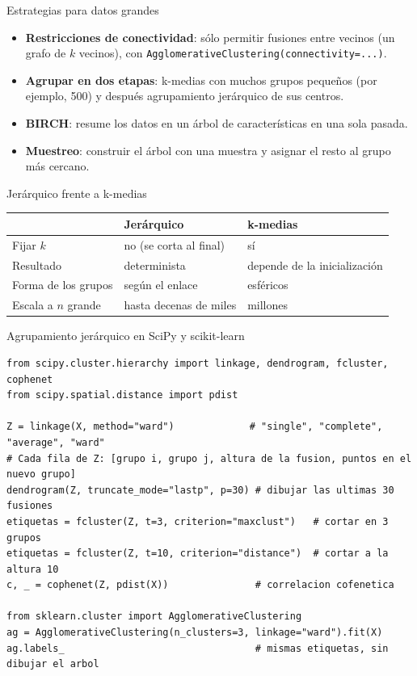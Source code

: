 \documentclass[aspectratio=169,11pt]{beamer}
\begin{document}
\begin{frame}{Estrategias para datos grandes}
  \begin{itemize}
    \item \textbf{Restricciones de conectividad}: sólo permitir fusiones entre vecinos
          (un grafo de $k$ vecinos), con \texttt{AgglomerativeClustering(connectivity=...)}.
    \item \textbf{Agrupar en dos etapas}: k-medias con muchos grupos pequeños (por ejemplo, 500)
          y después agrupamiento jerárquico de sus centros.
    \item \textbf{BIRCH}: resume los datos en un árbol de características en una sola pasada.
    \item \textbf{Muestreo}: construir el árbol con una muestra y asignar el resto al grupo más cercano.
  \end{itemize}
  \vspace{6pt}
  \begin{block}{Jerárquico frente a k-medias}
    \renewcommand{\arraystretch}{1.2}
    \begin{tabular}{@{}lll@{}}
      & \textbf{Jerárquico} & \textbf{k-medias}\\
      \midrule
      Fijar $k$ & no (se corta al final) & sí \\
      Resultado & determinista & depende de la inicialización \\
      Forma de los grupos & según el enlace & esféricos \\
      Escala a $n$ grande & hasta decenas de miles & millones \\
    \end{tabular}
  \end{block}
\end{frame}

\begin{frame}[fragile]{Agrupamiento jerárquico en SciPy y scikit-learn}
\begin{lstlisting}
from scipy.cluster.hierarchy import linkage, dendrogram, fcluster, cophenet
from scipy.spatial.distance import pdist

Z = linkage(X, method="ward")             # "single", "complete", "average", "ward"
# Cada fila de Z: [grupo i, grupo j, altura de la fusion, puntos en el nuevo grupo]
dendrogram(Z, truncate_mode="lastp", p=30) # dibujar las ultimas 30 fusiones
etiquetas = fcluster(Z, t=3, criterion="maxclust")   # cortar en 3 grupos
etiquetas = fcluster(Z, t=10, criterion="distance")  # cortar a la altura 10
c, _ = cophenet(Z, pdist(X))               # correlacion cofenetica

from sklearn.cluster import AgglomerativeClustering
ag = AgglomerativeClustering(n_clusters=3, linkage="ward").fit(X)
ag.labels_                                 # mismas etiquetas, sin dibujar el arbol
\end{lstlisting}
\end{frame}
\end{document}
